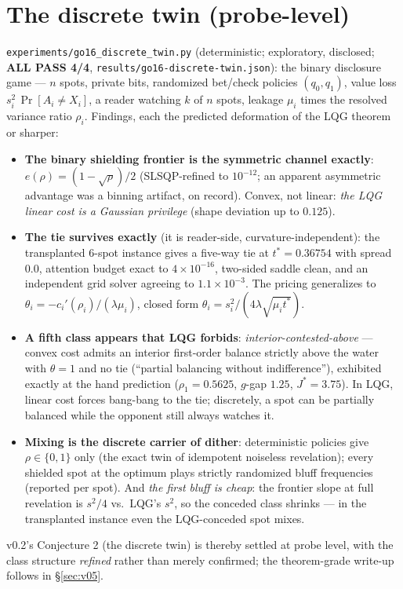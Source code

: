 \documentclass[11pt]{article}
\theoremstyle{definition}
\begin{document}
\section{The discrete twin (probe-level)}\label{sec:twin}

\texttt{experiments/go16\_discrete\_twin.py} (deterministic;
exploratory, disclosed; \textbf{ALL PASS 4/4},
\texttt{results/go16-discrete-twin.json}): the binary disclosure
game --- $n$ spots, private bits, randomized bet/check policies
$(q_0, q_1)$, value loss $s_i^2\,\Pr[A_i\neq X_i]$, a reader
watching $k$ of $n$ spots, leakage $\mu_i$ times the resolved
variance ratio $\rho_i$. Findings, each the predicted deformation of
the LQG theorem or sharper:
\begin{itemize}
\item \textbf{The binary shielding frontier is the symmetric channel
exactly}: $e(\rho) = (1-\sqrt\rho)/2$ (SLSQP-refined to $10^{-12}$;
an apparent asymmetric advantage was a binning artifact, on record).
Convex, not linear: \emph{the LQG linear cost is a Gaussian
privilege} (shape deviation up to $0.125$).
\item \textbf{The tie survives exactly} (it is reader-side,
curvature-independent): the transplanted $6$-spot instance gives a
five-way tie at $t^\ast = 0.36754$ with spread $0.0$, attention
budget exact to $4\times10^{-16}$, two-sided saddle clean, and an
independent grid solver agreeing to $1.1\times10^{-3}$. The pricing
generalizes to $\theta_i = -c_i'(\rho_i)/(\lambda\mu_i)$, closed
form $\theta_i = s_i^2/(4\lambda\sqrt{\mu_i t^\ast})$.
\item \textbf{A fifth class appears that LQG forbids}:
\emph{interior-contested-above} --- convex cost admits an interior
first-order balance strictly above the water with $\theta = 1$ and
no tie (``partial balancing without indifference''), exhibited
exactly at the hand prediction ($\rho_1 = 0.5625$, $g$-gap $1.25$,
$J^\ast = 3.75$). In LQG, linear cost forces bang-bang to the tie;
discretely, a spot can be partially balanced while the opponent
still always watches it.
\item \textbf{Mixing is the discrete carrier of dither}:
deterministic policies give $\rho\in\{0,1\}$ only (the exact twin of
idempotent noiseless revelation); every shielded spot at the optimum
plays strictly randomized bluff frequencies (reported per spot).
And \emph{the first bluff is cheap}: the frontier slope at full
revelation is $s^2/4$ vs.\ LQG's $s^2$, so the conceded class
shrinks --- in the transplanted instance even the LQG-conceded spot
mixes.
\end{itemize}
v0.2's Conjecture 2 (the discrete twin) is thereby settled at probe
level, with the class structure \emph{refined} rather than merely
confirmed; the theorem-grade write-up follows in
\S\ref{sec:v05}.
\end{document}
